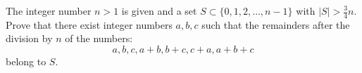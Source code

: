 The integer number $n > 1$ is given and a set $S \subset \{0, 1, 2, \ldots, n-1\}$ with $|S| > \frac{3}{4} n$. Prove that there exist integer numbers $a, b, c$ such that the remainders after the division by $n$ of the numbers:
\[a, b, c, a+b, b+c, c+a, a+b+c\]
belong to $S$.